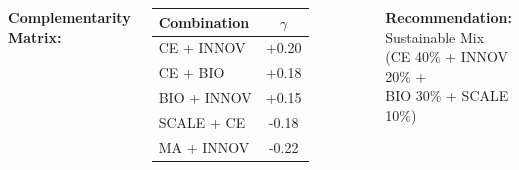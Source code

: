 \documentclass[aspectratio=169,12pt,xcolor=dvipsnames]{beamer}
\newcommand{\highlight}[1]{{\color{alpla_blue}\textbf{#1}}}
\begin{document}
\begin{frame}
\begin{columns}[T]
    \centering
    \textbf{Complementarity Matrix:}

    \vspace{0.2cm}

    {\small
    \begin{tabular}{lc}
      \toprule
      Combination & $\gamma$ \\
      \midrule
      CE + INNOV & +0.20 \\
      CE + BIO & +0.18 \\
      BIO + INNOV & +0.15 \\
      \midrule
      SCALE + CE & -0.18 \\
      MA + INNOV & -0.22 \\
      \bottomrule
    \end{tabular}
    }

    \vspace{0.5cm}

    \textbf{\highlight{Recommendation:}} \\
    Sustainable Mix \\
    (CE 40\% + INNOV 20\% + \\
    BIO 30\% + SCALE 10\%)
  \end{columns}

\end{frame}

\end{document}
